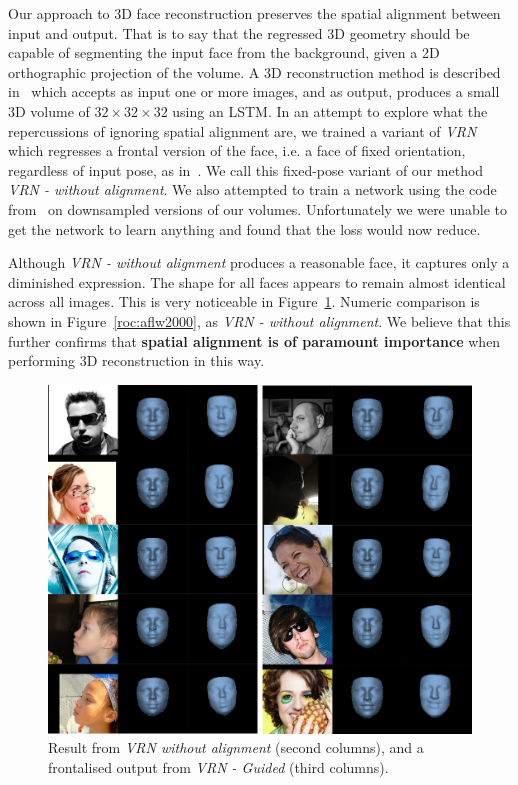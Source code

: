 Our approach to 3D face reconstruction preserves the spatial alignment
between input and output. That is to say that the regressed 3D
geometry should be capable of segmenting the input face from the
background, given a 2D orthographic projection of the volume. A 3D
reconstruction method is described in~\cite{choy20163d} which accepts
as input one or more images, and as output, produces a small 3D volume
of $32 \times 32 \times 32$ using an LSTM. In an attempt to explore
what the repercussions of ignoring spatial alignment are, we trained a
variant of \textit{VRN} which regresses a frontal version of the face,
i.e. a face of fixed orientation, regardless of input pose, as
in~\cite{choy20163d}. We call this fixed-pose variant of our method
\textit{VRN - without alignment}. We also attempted to train a network
using the code from~\cite{choy20163d} on downsampled versions of our
volumes. Unfortunately we were unable to get the network to learn
anything and found that the loss would now reduce.

Although \textit{VRN - without alignment} produces a reasonable face,
it captures only a diminished expression. The shape for all faces
appears to remain almost identical across all images. This is very
noticeable in Figure~\ref{fig:frontal_visual}. Numeric comparison is
shown in Figure~\ref{roc:aflw2000}, as \textit{VRN - without
  alignment}. We believe that this further confirms that
\textbf{spatial alignment is of paramount importance} when performing
3D reconstruction in this way.

\begin{figure}
  \centering
  \includegraphics[width=0.7\linewidth]{img/frontal.png}
  \caption[Visual results when spatial alignment is ignored]{Result from
    \textit{VRN without alignment} (second columns), and a frontalised
    output from \textit{VRN - Guided} (third columns).}
  \label{fig:frontal_visual}
\end{figure}

